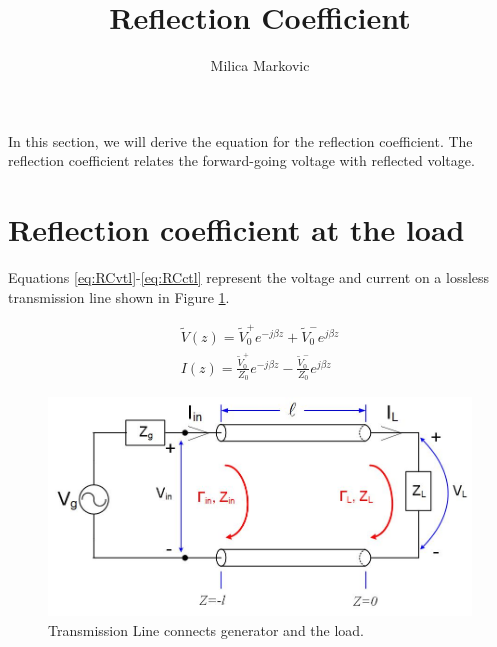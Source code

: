 \documentclass{ximera}
\title{Reflection Coefficient}
\author{Milica Markovic}
\begin{document}
  
\begin{abstract}  

\end{abstract}  
\maketitle    



In this section, we will derive the equation for the reflection coefficient. The reflection coefficient relates the forward-going voltage with reflected voltage.

\section{Reflection coefficient at the load}

Equations \ref{eq:RCvtl}-\ref{eq:RCctl} represent the voltage and current on a lossless transmission line shown in Figure \ref{fig:RCTLCircuit}.

\begin{eqnarray}
\tilde{V}(z)=\tilde{V}_0^+ e^{-j \beta z} +\tilde{V}_0^- e^{j \beta z} \label{eq:RCvtl} \\ 
I(z)=\frac{\tilde{V}_0^+}{Z_0} e^{- j \beta z} - \frac{\tilde{V}_0^-}{Z_0} e^{j \beta z}\label{eq:RCctl}
\end{eqnarray}



\begin{figure}[htbp]
\begin{center}
\includegraphics[scale=0.3]{../jpg/trline.jpg}
\end{center}
\caption{Transmission Line connects generator and the load.}
\label{fig:RCTLCircuit}
\end{figure}
\end{document}
